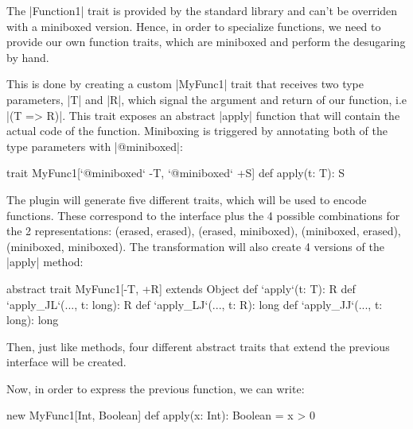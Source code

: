 The |Function1| trait is provided by the standard library and can't be overriden with a miniboxed version. Hence, in order to specialize functions, we need to provide our own function traits, which are miniboxed and perform the desugaring by hand.

This is done by creating a custom |MyFunc1| trait that receives two type parameters, |T| and |R|, which signal the argument and return of our function, i.e |(T => R)|. This trait exposes an abstract |apply| function that will contain the actual code of the function. Miniboxing is triggered by annotating both of the type parameters with |@miniboxed|:

\begin{lstlisting-nobreak}
 trait MyFunc1[`@miniboxed` -T, `@miniboxed` +S] {
   def apply(t: T): S
 }
\end{lstlisting-nobreak}

The plugin will generate five different traits, which will be used to encode functions. These correspond to the interface plus the 4 possible combinations for the 2 representations: (erased, erased), (erased, miniboxed), (miniboxed, erased), (miniboxed, miniboxed). The transformation will also create 4 versions of the |apply| method:

\begin{lstlisting-nobreak}
  abstract trait MyFunc1[-T, +R] extends Object {
    def `apply`(t: T): R
    def `apply_JL`(..., t: long): R
    def `apply_LJ`(..., t: R): long
    def `apply_JJ`(..., t: long): long
  }
\end{lstlisting-nobreak}

Then, just like methods, four different abstract traits that extend the previous interface will be created.

%

Now, in order to express the previous function, we can write:

\begin{lstlisting-nobreak}
 new MyFunc1[Int, Boolean] { def apply(x: Int): Boolean = x > 0 }
\end{lstlisting-nobreak}


